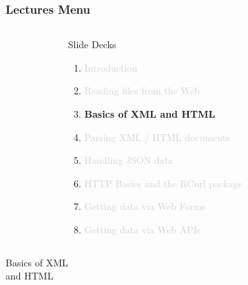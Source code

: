 \documentclass{beamer}\usepackage[]{graphicx}\usepackage[]{color}
\begin{document}
\begin{frame}
\frametitle{Lectures Menu}

\begin{columns}[t]
\begin{column}{0.1\textwidth}
\end{column}
\begin{column}{0.8\textwidth}
 \begin{block}{Slide Decks}
  \begin{enumerate}
   \item \textcolor{lightgray}{Introduction}
   \item \textcolor{lightgray}{Reading files from the Web}
   \item \textbf{Basics of XML and HTML}
   \item \textcolor{lightgray}{Parsing XML / HTML documents}   
   \item \textcolor{lightgray}{Handling JSON data}
   \item \textcolor{lightgray}{HTTP Basics and the RCurl package}
   \item \textcolor{lightgray}{Getting data via Web Forms}
   \item \textcolor{lightgray}{Getting data via Web APIs}
  \end{enumerate}
 \end{block}
\end{column}
\begin{column}{0.1\textwidth}
\end{column}
\end{columns}

\end{frame}


\begin{frame}
 \begin{center}
  \Huge{\textcolor{mandarina}{Basics of XML \\ and HTML}}
 \end{center}
\end{frame}

\end{document}
